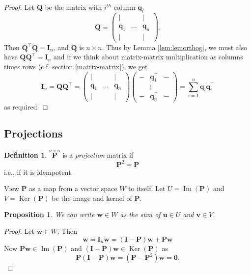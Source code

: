 \documentclass[
]{book}
\newtheorem{proposition}{Proposition}[chapter]
\theoremstyle{definition}
\newtheorem{definition}{Definition}[chapter]
\theoremstyle{definition}
\theoremstyle{definition}
\theoremstyle{definition}
\theoremstyle{remark}
\begin{document}
\begin{proof}
Let \(\mathbf Q\) be the matrix with \(i^{th}\) column \(\mathbf q_i\)
\[\mathbf Q=\left(
    \begin{array}{ccc}
    | &&|\\
    \mathbf q_1& \ldots& \mathbf q_n\\
    | &&|
      \end{array}\right).\]
Then \(\mathbf Q^\top \mathbf Q=\mathbf I_n\), and \(\mathbf Q\) is \(n\times n\). Thus by Lemma \ref{lem:lemorthog}, we must also have \(\mathbf Q\mathbf Q^\top=\mathbf I_n\) and if we think about matrix-matrix multiplication as columns times rows (c.f. section \ref{matrix-matrix}), we get
\[\mathbf I_n=\mathbf Q\mathbf Q^\top=\left(
    \begin{array}{ccc}
    | &&|\\
    \mathbf q_1& \ldots& \mathbf q_n\\
    | &&|
      \end{array}\right) \left(
    \begin{array}{ccc}
    - &\mathbf q_1^\top&-\\
    & \vdots& \\
    - &\mathbf q_n^\top&-
      \end{array}\right) = \sum_{i=1}^n \mathbf q_i \mathbf q_i^\top\]
as required.
\end{proof}

\subsection{Projections}\label{projection-matrix}

\begin{definition}
\protect\hypertarget{def:projection}{}\label{def:projection}\(\stackrel{n \times n}{\mathbf P}\) is a \emph{projection}
matrix if
\[\mathbf P^2 =\mathbf P\]
i.e., if it is idempotent.
\end{definition}

View \(\mathbf P\) as a map from a vector space \(W\) to itself. Let \(U=\operatorname{Im}(\mathbf P)\) and \(V=\operatorname{Ker}(\mathbf P)\) be the image and kernel of \(\mathbf P\).

\begin{proposition}
\protect\hypertarget{prp:projec1}{}\label{prp:projec1}We can write \(\mathbf w\in W\) as the sum of \(\mathbf u\in U\) and \(\mathbf v\in V\).
\end{proposition}

\begin{proof}
Let \(\mathbf w\in W\). Then
\[\mathbf w= \mathbf I_n \mathbf w=(\mathbf I-\mathbf P)\mathbf w+ \mathbf P\mathbf w\]
Now \(\mathbf P\mathbf w\in \operatorname{Im}(\mathbf P)\) and \((\mathbf I-\mathbf P)\mathbf w\in \operatorname{Ker}(\mathbf P)\) as
\[\mathbf P(\mathbf I-\mathbf P)\mathbf w= (\mathbf P-\mathbf P^2)\mathbf w={\boldsymbol 0}.\]
\end{proof}
\end{document}
